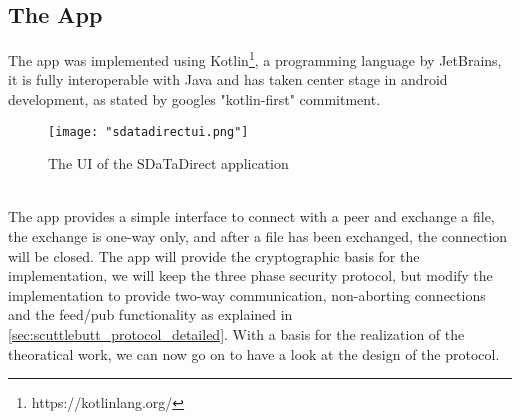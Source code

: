 \subsection{The App}
The app was implemented using Kotlin\footnote{https://kotlinlang.org/}, a programming language by JetBrains, it is fully interoperable with Java and has taken center stage in android development, as stated by googles "kotlin-first" commitment\cite{Kotlin}. 
\\
\begin{figure}[!h]
	\centering
	\texttt{[image: "sdatadirectui.png"]}
	\caption{The UI of the SDaTaDirect application\cite{SDaTaDirect}}
	\label{fig:appUI}
\end{figure}
\\
The app provides a simple interface to connect with a peer and exchange a file, the exchange is one-way only, and after a file has been exchanged, the connection will be closed. The app will provide the cryptographic basis for the implementation, we will keep the three phase security protocol, but modify the implementation to provide two-way communication, non-aborting connections and the feed/pub functionality as explained in \ref{sec:scuttlebutt_protocol_detailed}. With a basis for the realization of the theoratical work, we can now go on to have a look at the design of the protocol.


